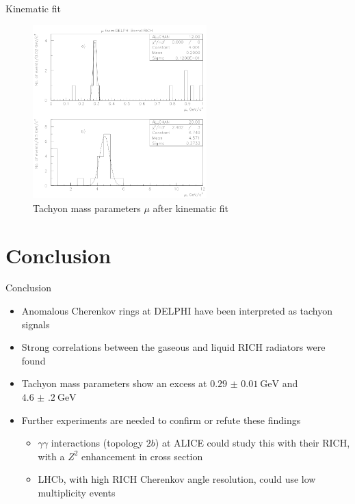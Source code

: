\documentclass{beamer}
\begin{document}
\begin{frame}{Kinematic fit}
  \begin{figure}
    \centering
    \includegraphics[width = 0.6\textwidth]{ConstrainedMassParameters.png}
    \caption{Tachyon mass parameters $\mu$ after kinematic fit}
  \end{figure}
\end{frame}

\section{Conclusion}
\begin{frame}{Conclusion}
  \begin{itemize}
    \item{Anomalous Cherenkov rings at DELPHI have been interpreted as tachyon signals}
    \item{Strong correlations between the gaseous and liquid RICH radiators were found}
    \item{Tachyon mass parameters show an excess at $\SI{0.29(1)}{\giga\eV}$ and $\SI{4.6(2)}{\giga\eV}$}
    \item{Further experiments are needed to confirm or refute these findings}
    \begin{itemize}
      \item{$\gamma\gamma$ interactions (topology $2b$) at ALICE could study this with their RICH, with a $Z^2$ enhancement in cross section}
      \item{LHCb, with high RICH Cherenkov angle resolution, could use low multiplicity events}
    \end{itemize}
  \end{itemize}
\end{frame}
\end{document}
